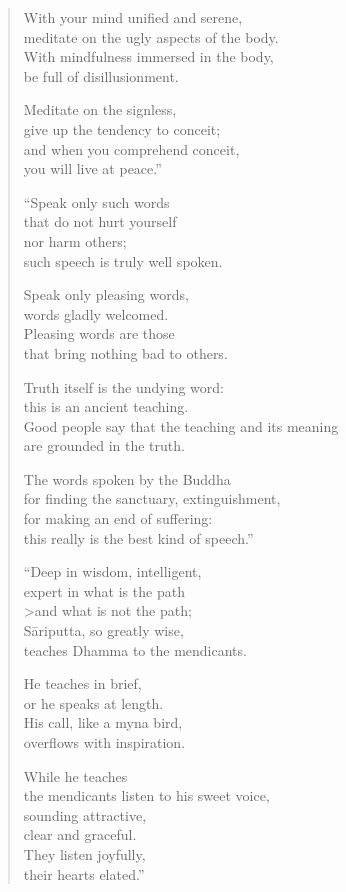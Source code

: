 \documentclass[12pt,openany]{book}%
\begin{document}
\begin{verse}
With your mind unified and serene, \\
meditate on the ugly aspects of the body. \\
With mindfulness immersed in the body, \\
be full of disillusionment. 

Meditate on the signless, \\
give up the tendency to conceit; \\
and when you comprehend conceit, \\
you will live at peace.” 

“Speak only such words \\
that do not hurt yourself \\
nor harm others; \\
such speech is truly well spoken. 

Speak only pleasing words, \\
words gladly welcomed. \\
Pleasing words are those \\
that bring nothing bad to others. 

Truth itself is the undying word: \\
this is an ancient teaching. \\
Good people say that the teaching and its meaning \\
are grounded in the truth. 

The words spoken by the Buddha \\
for finding the sanctuary, extinguishment, \\
for making an end of suffering: \\
this really is the best kind of speech.” 

“Deep in wisdom, intelligent, \\
expert in what is the path \\>and what is not the path; \\
\textsanskrit{Sāriputta}, so greatly wise, \\
teaches Dhamma to the mendicants. 

He teaches in brief, \\
or he speaks at length. \\
His call, like a myna bird, \\
overflows with inspiration. 

While he teaches \\
the mendicants listen to his sweet voice, \\
sounding attractive, \\
clear and graceful. \\
They listen joyfully, \\
their hearts elated.” 


\end{verse}
\end{document}

